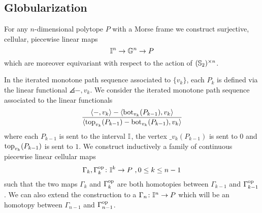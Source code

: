 
\subsection{Globularization} \label{ss:globularization}

For any $n$-dimensional polytope $P$ with a Morse frame we construct surjective, cellular, piecewise linear maps
\[
\mathbb{I}^n \to \mathbb{G}^n \to P
\]
which are moreover equivariant with respect to the action of $(\mathbb{S}_2)^{\times n}$.

In the iterated monotone path sequence associated to $\{v_k\}$, each $P_k$ is defined via the linear functional $\angles{-,v_k}$.
We consider the iterated monotone path sequence associated to the linear functionals
\begin{equation} \label{eq:new-projection}
	\frac{\langle-,v_k\rangle-\langle\operatorname{bot}_{v_k}(P_{k-1}),v_k\rangle}{\langle\operatorname{top}_{v_k}(P_{k-1})-\operatorname{bot}_{v_k}(P_{k-1}),v_k\rangle}
\end{equation}
where each $P_{k-1}$ is sent to the interval $\mathbb{I}$, the vertex $\bm_{v_k}(P_{k-1})$ is sent to $0$ and $\operatorname{top}_{v_k}(P_{k-1})$ is sent to $1$.
We construct inductively a family of continuous piecewise linear cellular maps
\[
\Gamma_k, \Gamma_k^{\mathrm{op}} \colon \mathbb{I}^k \to P \ , 0 \leq k \leq n-1
\]
such that the two maps $\Gamma_k$ and $\Gamma_k^{\mathrm{op}}$ are both homotopies between $\Gamma_{k-1}$ and $\Gamma_{k-1}^{\mathrm{op}}$.
We can also extend the construction to a $\Gamma_n \colon \mathbb{I}^n \to P$ which will be an homotopy between $\Gamma_{n-1}$ and $\Gamma_{n-1}^{\mathrm{op}}$.

